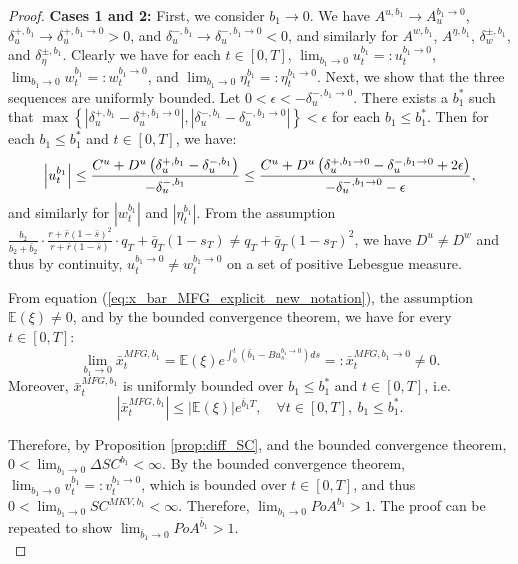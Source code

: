 \documentclass[11pt]{article}
\begin{document}
\begin{proof}
	\textbf{Cases 1 and 2:} First, we consider $b_1 \to 0$. We have $A^{u,b_1} \to A^{b_1\to 0}_u$, $\delta^{+,b_1}_u \to \delta^{+,b_1\to 0}_u>0$, and $\delta^{-,b_1}_u \to \delta^{-,b_1\to 0}_u<0$, and similarly for $A^{w,b_1}$, $A^{\eta,b_1}$, $\delta^{\pm,b_1}_w$, and $\delta^{\pm,b_1}_\eta$. Clearly we have for each $t\in[0,T]$, $\lim_{b_1 \to 0}u^{b_1}_t=:u^{b_1\to 0}_t$, $\lim_{b_1 \to 0}w^{b_1}_t=:w^{b_1 \to 0}_t$, and $\lim_{b_1 \to 0}\eta^{b_1}_t=:\eta^{b_1 \to 0}_t$. Next, we show that the three sequences are uniformly bounded. Let $0<\epsilon<-\delta^{-,b_1\to 0}_u$. There exists a $b_1^*$ such that $\max \left \{\left| \delta^{+,b_1}_u-\delta^{+,b_1\to0}_u \right|,\left| \delta^{-,b_1}_u-\delta^{-,b_1\to0}_u \right| \right\}<\epsilon$ for each $b_1 \leq b_1^*$. Then for each $b_1 \leq b_1^*$ and $t\in[0,T]$, we have:
	\begin{equation*}
		\left|u^{b_1}_t\right| \leq \frac{C^u+D^u\left(\delta^{+,b_1}_u-\delta^{-,b_1}_u\right) }{-\delta^{-,b_1}_u} \\
		\leq \frac{C^u+D^u\left(\delta^{+,b_1\to 0}_u-\delta^{-,b_1 \to 0}_u+2\epsilon\right) }{-\delta^{-,b_1\to 0}_u-\epsilon},
	\end{equation*}
	and similarly for $\left|w^{b_1}_t\right|$ and $\left|\eta^{b_1}_t\right|$. From the assumption $\frac{b_2}{b_2+\bar{b}_2}\cdot \frac{r + \bar{r}(1- \bar{s})^2}{r + \bar{r}(1-\bar{s})}\cdot q_T+\bar{q}_T(1-s_T) \neq q_T+\bar{q}_T(1-s_T)^2$, we have $D^{u} \neq D^{w}$ and thus by continuity, $u^{b_1\to 0}_t \neq w^{b_1\to 0}_t$ on a set of positive Lebesgue measure.
	
	From equation (\ref{eq:x_bar_MFG_explicit_new_notation}), the assumption $\mathbb{E}(\xi)\neq 0$, and by the bounded convergence theorem, we have for every $t \in [0,T]$:
	\begin{equation*}
	\lim_{b_1\to 0}\bar{x}_t^{MFG,b_1} = \mathbb{E}(\xi) e^{\int_0^t(\bar{b}_1-B u^{b_1\to 0}_s)ds} =: \bar{x}_t^{MFG,b_1\to 0}\neq 0.
	\end{equation*}
	Moreover, $\bar{x}_t^{MFG,b_1}$ is uniformly bounded over $b_1 \leq b_1^*$ and $t \in [0,T]$, i.e. 
	$$ \left\vert \bar{x}^{MFG,b_1}_t \right\vert \leq \left\vert \mathbb{E}(\xi) \right\vert e^{ \bar{b}_1 T }, \quad \forall t \in [0,T],\ b_1 \leq b_1^*. $$ 
	
	Therefore, by Proposition \ref{prop:diff_SC}, and the bounded convergence theorem, $0<\lim_{b_1 \to 0} \Delta SC^{b_1}<\infty$. By the bounded convergence theorem, $\lim_{b_1 \to 0}v^{b_1}_t=:v_t^{b_1 \to 0}$, which is bounded over $t\in [0,T]$, and thus $0<\lim_{b_1 \to 0} SC^{MKV,b_1}<\infty.$
    Therefore, $\lim_{b_1 \to 0} PoA^{b_1} > 1$. The proof can be repeated to show $\lim_{\bar{b}_1 \to 0} PoA^{\bar{b}_1}  > 1$.\\
    


\end{proof}
\end{document}

